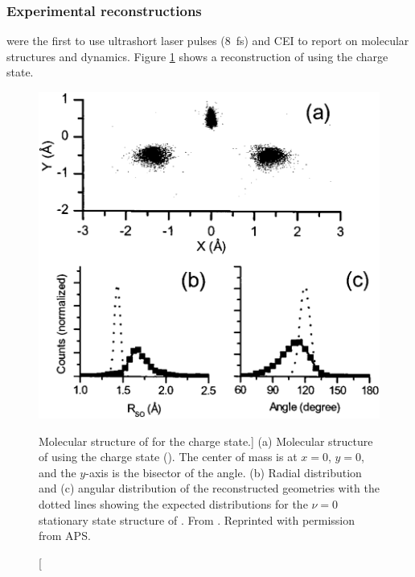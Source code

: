 
\subsubsection*{Experimental reconstructions}
\citet{Legare05structure,Legare05dynamics} were the first to use ultrashort laser pulses (\SI{8}{\fs}) and CEI to report on molecular structures and dynamics. Figure \ref{fig:SO2-232structure} shows a reconstruction of  using the  charge state.

\begin{figure}
  \centering
  \includegraphics[width=\textwidth]{gfx/LegareSO2-232Structure}
  \caption
  [Molecular structure of  for the  charge state.]
  {(a) Molecular structure of  using the  charge state (). The center of mass is at $x=0$, $y=0$, and the $y$-axis is the bisector of the angle. (b) Radial distribution and (c) angular distribution of the reconstructed geometries with the dotted lines showing the expected distributions for the $\nu=0$ stationary state structure of . From \citet{Legare05structure}. Reprinted with permission from APS.}
  \label{fig:SO2-232structure}
\end{figure}

